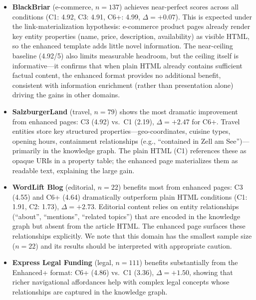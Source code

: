 \documentclass[runningheads]{llncs}
\begin{document}
\begin{itemize}
    \item \textbf{BlackBriar} (e-commerce, $n = 137$) achieves near-perfect
          scores across all conditions (C1: 4.92, C3: 4.91, C6+: 4.99,
          $\Delta = +0.07$).
          This is expected under the link-materialization hypothesis:
          e-commerce product pages already render key entity properties
          (name, price, description, availability) as visible HTML,
          so the enhanced template adds little novel information.
          The near-ceiling baseline (4.92/5) also limits measurable
          headroom, but the ceiling itself is informative---it
          confirms that when plain HTML already contains sufficient
          factual content, the enhanced format provides no additional
          benefit, consistent with information enrichment (rather than
          presentation alone) driving the gains in other domains.
    \item \textbf{SalzburgerLand} (travel, $n = 79$) shows the most dramatic
          improvement from enhanced pages: C3 (4.92) vs.\ C1 (2.19),
          $\Delta = +2.47$ for C6+.  Travel entities store key structured
          properties---geo-coordinates, cuisine types, opening hours,
          containment relationships (e.g., ``contained in Zell am
          See'')---primarily in the knowledge graph.  The plain HTML
          (C1) references these as opaque URIs in a property table;
          the enhanced page materializes them as readable text,
          explaining the large gain.
    \item \textbf{WordLift Blog} (editorial, $n = 22$) benefits most from
          enhanced pages: C3 (4.55) and C6+ (4.64) dramatically
          outperform plain HTML conditions (C1: 1.91, C2: 1.73),
          $\Delta = +2.73$.  Editorial content relies on entity
          relationships (``about'', ``mentions'', ``related topics'')
          that are encoded in the knowledge graph but absent from
          the article HTML.  The enhanced page surfaces these
          relationships explicitly.  We note that this domain has
          the smallest sample size ($n = 22$) and its results should
          be interpreted with appropriate caution.
    \item \textbf{Express Legal Funding} (legal, $n = 111$) benefits substantially from
          the Enhanced+ format: C6+ (4.86) vs.\ C1 (3.36),
          $\Delta = +1.50$, showing that
          richer navigational affordances help with complex legal concepts
          whose relationships are captured in the knowledge graph.
\end{itemize}
\end{document}
